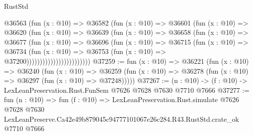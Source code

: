 \begin{lexlean}{RustStd}
\begin{coremodule}
                            @36563
                              (fun (x : @10) =>
                              @36582
                                (fun (x : @10) =>
                                @36601
                                  (fun (x : @10) =>
                                  @36620
                                    (fun (x : @10) =>
                                    @36639
                                      (fun (x : @10) =>
                                      @36658
                                        (fun (x : @10) =>
                                        @36677
                                          (fun (x : @10) =>
                                          @36696
                                            (fun (x : @10) =>
                                            @36715
                                              (fun (x : @10) =>
                                              @36734
                                                (fun (x : @10) =>
                                                @36753
                                                  (fun (x : @10) => @37200))))))))))))))))))))))))
@37259 := fun (x : @10) =>
  @36221
    (fun (x : @10) =>
    @36240
      (fun (x : @10) =>
      @36259 (fun (x : @10) => @36278 (fun (x : @10) => @36297 (fun (x : @10) => @37248)))))
@37267 := (n : @10) -> (f : @10) -> LexLeanPreservation.Rust.FunSem @7626 @7628 @7630 @7710 @7666
@37277 := fun (n : @10) =>
  fun (f : @10) =>
  LexLeanPreservation.Rust.simulate
    @7626
    @7628
    @7630
    LexLeanPreserve.Ca42e49b879045c94777101067e26c284.R43.RustStd.crate_ok
    @7710
    @7666
\end{coremodule}
\end{lexlean}
